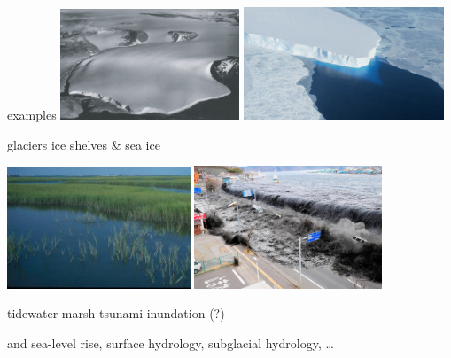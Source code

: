 \documentclass[hide notes,intlimits]{beamer}
\begin{document}
\begin{frame}{examples}
\includegraphics[width=0.4\textwidth,keepaspectratio=true]{polaris}
\hfill
\includegraphics[width=0.45\textwidth,keepaspectratio=true]{supp4rignot-small}

\small glaciers \hfill ice shelves \& sea ice
\medskip

\includegraphics[width=0.41\textwidth,keepaspectratio=true]{marsh-water}
\hfill
\includegraphics[width=0.42\textwidth,keepaspectratio=true]{tsunami-sendai}

\small tidewater marsh \hfill tsunami inundation (?)

\scriptsize and sea-level rise, surface hydrology, subglacial hydrology, \dots
\end{frame}
\end{document}
